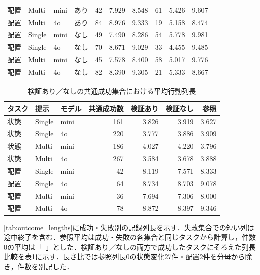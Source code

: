 \begin{table}[tb]
\begin{tabular}{llllrrrrrr}
配置 & Multi & mini & あり & 42 & 7.929 & 8.548 & 61 & 5.426 & 9.607 \\
配置 & Multi & 4o & あり & 84 & 8.976 & 9.333 & 19 & 5.158 & 8.474 \\
配置 & Single & mini & なし & 49 & 7.490 & 8.286 & 54 & 5.778 & 9.981 \\
配置 & Single & 4o & なし & 70 & 8.671 & 9.029 & 33 & 4.455 & 9.485 \\
配置 & Multi & mini & なし & 45 & 7.578 & 8.400 & 58 & 5.017 & 9.776 \\
配置 & Multi & 4o & なし & 82 & 8.390 & 9.305 & 21 & 5.333 & 8.667 \\
\hline
\end{tabular}
\end{table}

\begin{table}[tb]
\caption{検証あり／なしの共通成功集合における平均行動列長}\label{tab:common_success_internal}
\centering\small
\setlength{\tabcolsep}{3pt}
\begin{tabular}{lllrrrr}
\hline
タスク & 提示 & モデル & 共通成功数 & 検証あり & 検証なし & 参照 \\
\hline
状態 & Single & mini & 161 & 3.826 & 3.919 & 3.627 \\
状態 & Single & 4o & 220 & 3.777 & 3.886 & 3.909 \\
状態 & Multi & mini & 186 & 4.027 & 4.220 & 3.796 \\
状態 & Multi & 4o & 267 & 3.584 & 3.678 & 3.888 \\
配置 & Single & mini & 42 & 8.119 & 7.571 & 8.333 \\
配置 & Single & 4o & 64 & 8.734 & 8.703 & 9.078 \\
配置 & Multi & mini & 36 & 7.694 & 7.306 & 8.000 \\
配置 & Multi & 4o & 78 & 8.872 & 8.397 & 9.346 \\
\hline
\end{tabular}
\end{table}

\ref{tab:outcome_lengths}に成功・失敗別の記録列長を示す．失敗集合での短い列は途中終了を含む．参照平均は成功・失敗の各集合と同じタスクから計算し，件数0の平均は「--」とした．検証あり／なしの両方で成功したタスクにそろえた列長比較を表\ref{tab:common_success_internal}に示す．長さ比では参照列長0の状態変化27件・配置2件を分母から除き，件数を別記した．




